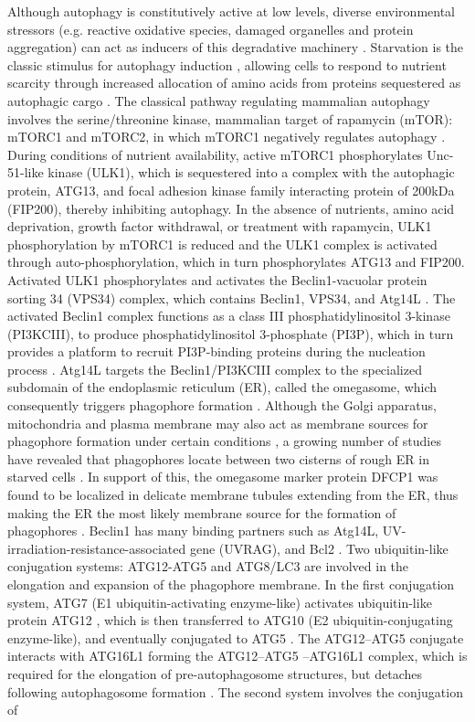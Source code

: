 Although autophagy is constitutively active at low levels, diverse environmental stressors (e.g. reactive oxidative species, damaged organelles and protein aggregation) can act as inducers of this degradative machinery \citep{Mizushima2008}. Starvation is the classic stimulus for autophagy induction \citep{Kuma2004,Mizushima2004a}, allowing cells to respond to nutrient scarcity through increased allocation of amino acids from proteins sequestered as autophagic cargo \citep{Hosokawa2009}. The classical pathway regulating mammalian autophagy involves the serine/threonine kinase, mammalian target of rapamycin (mTOR): mTORC1 and mTORC2, in which mTORC1 negatively regulates autophagy \citep{Guertin2009,Noda1998,Ravikumar2010b}. During conditions of nutrient availability, active mTORC1 phosphorylates Unc-51-like kinase (ULK1), which is sequestered into a complex with the autophagic protein, ATG13, and focal adhesion kinase family interacting protein of 200kDa (FIP200), thereby inhibiting autophagy. In the absence of nutrients, amino acid deprivation, growth factor withdrawal, or treatment with rapamycin, ULK1 phosphorylation by mTORC1 is reduced and the ULK1 complex is activated through auto-phosphorylation, which in turn phosphorylates ATG13 and FIP200.  Activated ULK1 phosphorylates and activates the Beclin1-vacuolar protein sorting 34 (VPS34) complex, which contains Beclin1, VPS34, and Atg14L \citep{Itakura2008}. The activated Beclin1 complex functions as a class III phosphatidylinositol 3-kinase (PI3KCIII), to produce phosphatidylinositol 3-phosphate (PI3P), which in turn provides a platform to recruit PI3P-binding proteins during the nucleation process \citep{Hosokawa2009,Kim2011,sarkar2013}. Atg14L targets the Beclin1/PI3KCIII complex to the specialized subdomain of the endoplasmic reticulum (ER), called the omegasome, which consequently triggers phagophore formation \citep{Axe2008,Matsunaga2010}. Although the Golgi apparatus, mitochondria and plasma membrane may also act as membrane sources for phagophore formation under certain conditions \citep{Axe2008,Ravikumar2010}, a growing number of studies have revealed that phagophores locate between two cisterns of rough ER in starved cells \citep{Hayashi-Nishino2009,Yla-Anttila2009}. In support of this, the omegasome marker protein DFCP1 was found to be localized in delicate membrane tubules extending from the ER, thus making the ER the most likely membrane source for the formation of phagophores \citep{Uemura2014}. Beclin1 has many binding partners such as Atg14L, UV-irradiation-resistance-associated gene (UVRAG), and Bcl2 \citep{He2010}. Two ubiquitin-like conjugation systems: ATG12-ATG5 and ATG8/LC3 are involved in the elongation and expansion of the phagophore membrane. In the first conjugation system, ATG7 (E1 ubiquitin-activating enzyme-like) activates ubiquitin-like protein ATG12 \citep{Ohsumi2001,Ohsumi1998}, which is then transferred to ATG10 (E2 ubiquitin-conjugating enzyme-like), and eventually conjugated to ATG5 \citep{Geng2008}. The ATG12–ATG5 conjugate interacts with ATG16L1 forming the ATG12–ATG5 –ATG16L1 complex, which is required for the elongation of pre-autophagosome structures, but detaches following autophagosome formation \citep{Mizushima2003}. The second system involves the conjugation of 